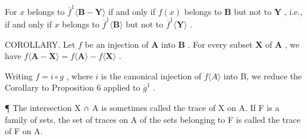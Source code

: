 For \(x\) belongs to \(\overline{f}^1\langle \mathbf{B} - \mathbf{Y}\rangle\) if and only if \(f(x)\) belongs to \(\mathbf{B}\) but not to \(\mathbf{Y}\) , i.e., if and only if \(x\) belongs to \(\overline{f}^1\langle \mathbf{B}\rangle\) but not to \(\overline{f}^1\langle \mathbf{Y}\rangle\) .

COROLLARY. Let \(f\) be an injection of \(\mathbf{A}\) into \(\mathbf{B}\) . For every subset \(\mathbf{X}\) of \(\mathbf{A}\) , we have \(f\langle \mathbf{A} - \mathbf{X}\rangle = f\langle \mathbf{A}\rangle - f\langle \mathbf{X}\rangle\) .

Writing \(f = i \circ g\) , where \(i\) is the canonical injection of \(f\langle A\rangle\) into B, we reduce the Corollary to Proposition 6 applied to \(\overline{g}^1\) .

¶ The intersection X ∩ A is sometimes called the trace of X on A. If F is a family of sets, the set of traces on A of the sets belonging to F is called the trace of F on A.

